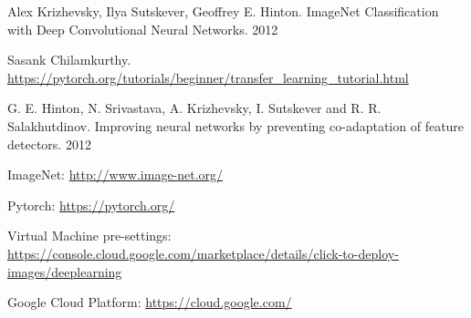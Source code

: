 \documentclass{article}
\begin{document}
\begin{thebibliography}{1}
	Alex Krizhevsky, Ilya Sutskever, Geoffrey E. Hinton. ImageNet Classification with Deep Convolutional
	Neural Networks. 2012

	Sasank Chilamkurthy. \url{https://pytorch.org/tutorials/beginner/transfer_learning_tutorial.html}
	
	G. E. Hinton, N. Srivastava, A. Krizhevsky, I. Sutskever and R. R. Salakhutdinov.
	Improving neural networks by preventing co-adaptation of feature detectors. 2012
	
	ImageNet: \url{http://www.image-net.org/}
	
	Pytorch: \url{https://pytorch.org/}
	
	Virtual Machine pre-settings: \url{https://console.cloud.google.com/marketplace/details/click-to-deploy-images/deeplearning}
	
	Google Cloud Platform: \url{https://cloud.google.com/}

	
\end{thebibliography}
\end{document}
